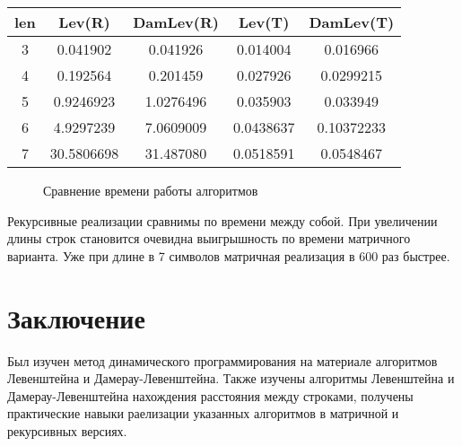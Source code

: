 \documentclass[12pt]{report}
\begin{document}
\begin{center}
	\begin{tabular}{|c c c c c|} 
 	\hline
	len & Lev(R) & DamLev(R) & Lev(T) & DamLev(T) \\ [0.5ex] 
 	\hline\hline
 	3 & 0.041902 & 0.041926 & 0.014004 & 0.016966\\
 	\hline
 	4 & 0.192564 & 0.201459 & 0.027926 & 0.0299215\\
 	\hline
	5 & 0.9246923 & 1.0276496 & 0.035903 & 0.033949\\
	\hline
	6 & 4.9297239 & 7.0609009 & 0.0438637 & 0.10372233\\
	\hline
	7 & 30.5806698 & 31.487080 & 0.0518591 & 0.0548467\\
	\hline
	\end{tabular}
\end{center}

\begin{figure}
\caption{Сравнение времени работы алгоритмов}
\end{figure}

\par
Рекурсивные реализации сравнимы по времени между собой. При увеличении длины строк становится очевидна выигрышность по времени матричного варианта. Уже при длине в 7 символов матричная реализация в 600 раз быстрее.

\chapter*{Заключение}
Был изучен метод динамического программирования на материале алгоритмов Левенштейна и Дамерау-Левенштейна.
Также изучены алгоритмы Левенштейна и Дамерау-Левенштейна нахождения расстояния между строками, получены практические навыки раелизации указанных алгоритмов
в матричной  и рекурсивных версиях. 
\end{document}
